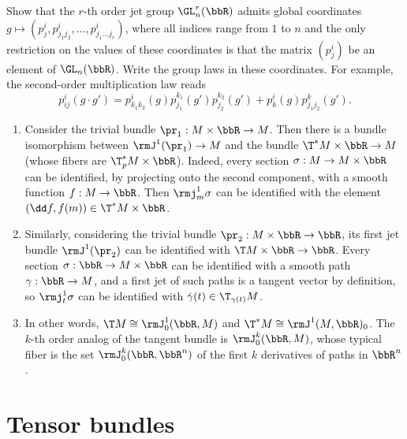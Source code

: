 \begin{xca}
    Show that the $r$-th order jet group $\GL^r_n(\bbR)$ admits global coordinates $g\mapsto (p^i_j,p^i_{j_1j_2},\ldots,p^i_{j_1\ldots j_r})$, where all indices range from $1$ to $n$ and the only restriction on the values of these coordinates is that the matrix $(p^i_j)$ be an element of $\GL_n(\bbR)$. Write the group laws in these coordinates. For example, the second-order multiplication law reads 
    \[p^i_{ij}(g\cdot g')=p^i_{k_1k_2}(g)p^{k_1}_{j_1}(g')p^{k_2}_{j_2}(g')+p^{i}_{k}(g)p^k_{j_1j_2}(g').\]
\end{xca}

\begin{example}
    \begin{enumerate}
        \item Consider the trivial bundle $\pr_1:M\times\bbR\to M$. Then there is a bundle isomorphism between $\rmJ^1(\pr_1)\to M$ and the bundle $\T^\ast M\times \bbR\to M$ (whose fibers are $\T^\ast_pM\times\bbR$). Indeed, every section $\sigma:M\to M\times\bbR$ can be identified, by projecting onto the second component, with a smooth function $f:M\to \bbR$. Then $\rmj^1_m\sigma$ can be identified with the element $(\dd f,f(m))\in \T^\ast M\times \bbR$.
        
        \item Similarly, considering the trivial bundle $\pr_2:M\times \bbR\to \bbR$, its first jet bundle $\rmJ^1(\pr_2)$ can be identified with $\T M\times \bbR\to \bbR$. Every section $\sigma:\bbR\to M\times\bbR$ can be identified with a smooth path $\gamma:\bbR\to M$, and a first jet of such paths is a tangent vector by definition, so $\rmj^1_t\sigma$ can be identified with $\dot\gamma(t)\in \T_{\gamma(t)}M$.

        \item In other words, $\T M\cong \rmJ^1_0(\bbR,M)$ and $\T^\ast M\cong \rmJ^1(M,\bbR)_0$. The $k$-th order analog of the tangent bundle is $\rmJ^k_0(\bbR,M)$, whose typical fiber is the set $\rmJ_0^k(\bbR,\bbR^n)$ of the first $k$ derivatives of paths in $\bbR^n$.
    \end{enumerate}
\end{example}







\section{Tensor bundles}


